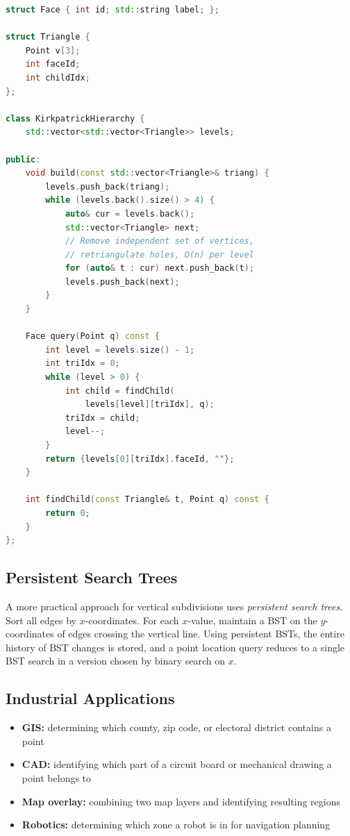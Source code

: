 \begin{lstlisting}[language=C++]
struct Face { int id; std::string label; };

struct Triangle {
    Point v[3];
    int faceId;
    int childIdx;
};

class KirkpatrickHierarchy {
    std::vector<std::vector<Triangle>> levels;

public:
    void build(const std::vector<Triangle>& triang) {
        levels.push_back(triang);
        while (levels.back().size() > 4) {
            auto& cur = levels.back();
            std::vector<Triangle> next;
            // Remove independent set of vertices,
            // retriangulate holes, O(n) per level
            for (auto& t : cur) next.push_back(t);
            levels.push_back(next);
        }
    }

    Face query(Point q) const {
        int level = levels.size() - 1;
        int triIdx = 0;
        while (level > 0) {
            int child = findChild(
                levels[level][triIdx], q);
            triIdx = child;
            level--;
        }
        return {levels[0][triIdx].faceId, ""};
    }

    int findChild(const Triangle& t, Point q) const {
        return 0;
    }
};
\end{lstlisting}

\subsection{Persistent Search Trees}

A more practical approach for vertical subdivisions uses \emph{persistent search trees}. Sort all edges by $x$-coordinates. For each $x$-value, maintain a BST on the $y$-coordinates of edges crossing the vertical line. Using persistent BSTs, the entire history of BST changes is stored, and a point location query reduces to a single BST search in a version chosen by binary search on $x$.

\subsection{Industrial Applications}

\begin{itemize}
    \item \textbf{GIS:} determining which county, zip code, or electoral district contains a point
    \item \textbf{CAD:} identifying which part of a circuit board or mechanical drawing a point belongs to
    \item \textbf{Map overlay:} combining two map layers and identifying resulting regions
    \item \textbf{Robotics:} determining which zone a robot is in for navigation planning
\end{itemize}

